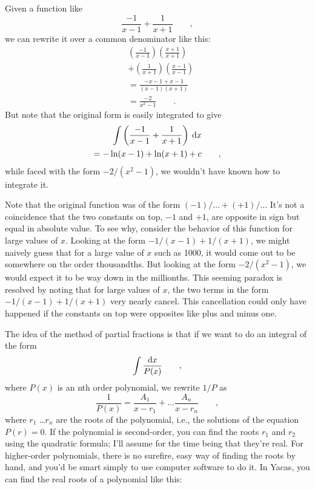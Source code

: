 Given a function like
\begin{equation*}
  \frac{-1}{x-1}+\frac{1}{x+1} \qquad ,
\end{equation*}
we can rewrite it over a common denominator like this:
\begin{align*}
  &\left(\frac{-1}{x-1}\right)\left(\frac{x+1}{x+1}\right) \\
  &+\left(\frac{1}{x+1}\right)\left(\frac{x-1}{x-1}\right) \\
  &=\frac{-x-1+x-1}{(x-1)(x+1)} \\
  &=\frac{-2}{x^2-1} \qquad .
\end{align*}
But note that the original form is easily integrated to give
\begin{multline*}
  \int \left(\frac{-1}{x-1}+\frac{1}{x+1}\right)\:\textup{d} x \\
    =-\ln(x-1)+\ln(x+1)+c \qquad ,
\end{multline*}
while faced with the form \linebreak[4] $-2/(x^2-1)$, we wouldn't have known how to
integrate it.

Note that the original function was of the form $(-1)/\ldots+(+1)/\ldots$
It's not a coincidence that the two constants on top, $-1$ and $+1$, are opposite in sign
but equal in absolute value. To see why, consider the behavior of
this function for large values of $x$. Looking at the form
$-1/(x-1)+1/(x+1)$, we might naively guess that for a large value of $x$
such as 1000, it would come out to be somewhere on the order thousandths.
But looking at the form $-2/(x^2-1)$, we would expect it to be way down in the millionths.
This seeming paradox is resolved by noting that for large values of $x$,
the two terms in the form $-1/(x-1)+1/(x+1)$ very nearly cancel. This cancellation
could only have happened if the constants on top were opposites like plus and minus one.

The idea of the method of partial fractions is that if we want to
do an integral of the form
\begin{equation*}
  \int \frac{\textup{d} x}{P(x)} \qquad ,
\end{equation*}
where $P(x)$ is an nth order polynomial, we rewrite $1/P$ as
\begin{equation*}
  \frac{1}{P(x)} = \frac{A_1}{x-r_1} + \ldots \frac{A_n}{x-r_n} \qquad ,
\end{equation*}
where $r_1$ \ldots $r_n$ are the roots of the polynomial, i.e., the
solutions of the equation $P(r)=0$. If the polynomial is second-order,
you can find the roots $r_1$ and $r_2$ using the quadratic formula; I'll assume for
the time being that they're real.
For higher-order polynomials, there is no surefire, easy
way of finding the roots by hand, and you'd be smart simply to use computer software
to do it. In Yacas, you can find the real roots of a polynomial like this:

